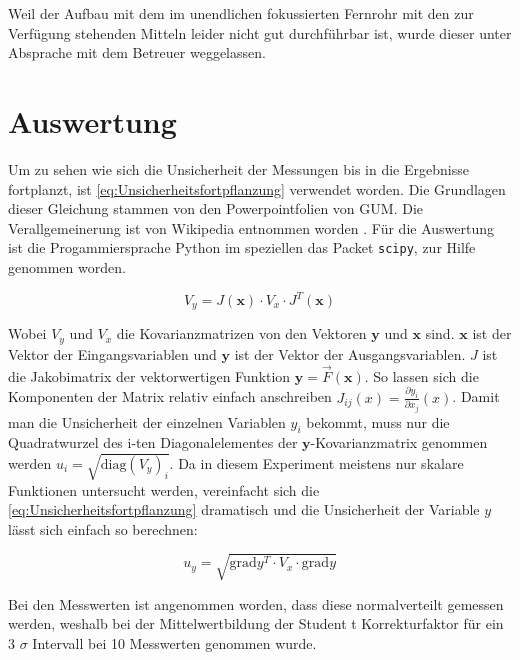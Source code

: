 \documentclass[11pt,ngerman]{scrartcl}
\begin{document}
Weil der Aufbau mit dem im unendlichen fokussierten Fernrohr mit den zur Verfügung stehenden Mitteln leider nicht gut durchführbar ist, wurde dieser unter Absprache mit dem Betreuer weggelassen.

\vspace{5mm}

\section{Auswertung}

\noindent Um zu sehen wie sich die Unsicherheit der Messungen bis in die Ergebnisse
fortplanzt, ist \autoref{eq:Unsicherheitsfortpflanzung} verwendet worden.
Die Grundlagen dieser Gleichung stammen von den Powerpointfolien von
GUM.\cite{WolfgangKessel2004} Die Verallgemeinerung ist von Wikipedia entnommen
worden \cite{2020Fehler}.
Für die Auswertung ist die Progammiersprache Python im speziellen das
Packet \verb#scipy#, zur Hilfe genommen worden.

\begin{equation}
	\label{eq:Unsicherheitsfortpflanzung}
	V_y = J(\bm{x}) \cdot V_x \cdot J^{T}(\bm{x})
\end{equation}

\noindent Wobei $V_y$ und $V_x$ die Kovarianzmatrizen von den Vektoren $\bm{y}$ und $\bm{x}$ sind.
$\bm{x}$ ist der Vektor der Eingangsvariablen und $\bm{y}$ ist der Vektor der Ausgangsvariablen.
$J$ ist die Jakobimatrix der vektorwertigen Funktion $\bm{y} = \vec{F}(\bm{x})$.
So lassen sich die Komponenten der Matrix relativ einfach anschreiben $J_{ij}(x) = \frac{\partial{y_i}}{\partial{x_j}}(x)$.
Damit man die Unsicherheit der einzelnen Variablen $y_i$ bekommt, muss nur die Quadratwurzel des i-ten Diagonalelementes der
$\bm{y}$-Kovarianzmatrix genommen werden $u_i= \sqrt{\mathrm{diag}(V_y)_i}$.
Da in diesem Experiment meistens nur skalare Funktionen untersucht werden, vereinfacht
sich die \autoref{eq:Unsicherheitsfortpflanzung} dramatisch und die Unsicherheit
der Variable $y$ lässt sich einfach so berechnen:

\begin{equation}
	\label{eq:graduncentainty}
	u_y = \sqrt{\mathrm{grad} y^T \cdot V_x \cdot \mathrm{grad} y}
\end{equation}


\vspace{2mm}

Bei den Messwerten ist angenommen worden, dass diese normalverteilt gemessen
werden, weshalb bei der Mittelwertbildung der Student t Korrekturfaktor für ein
3 $\sigma$ Intervall bei 10 Messwerten genommen wurde.
\end{document}
